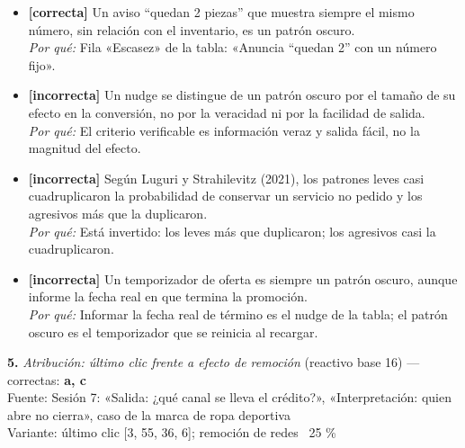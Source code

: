 \documentclass[10pt,letterpaper]{article}
\begin{document}
\begin{itemize}[leftmargin=1.2em,itemsep=0pt,topsep=1pt,parsep=0pt]
\item[\textbf{a)}] {\footnotesize \textbf{[correcta]} Un aviso \enquote{quedan 2 piezas} que muestra siempre el mismo número, sin relación con el inventario, es un patrón oscuro.\\ \textit{Por qué:} Fila «Escasez» de la tabla: «Anuncia \enquote{quedan 2} con un número fijo».}
\item[\textbf{b)}] {\footnotesize \textbf{[incorrecta]} Un nudge se distingue de un patrón oscuro por el tamaño de su efecto en la conversión, no por la veracidad ni por la facilidad de salida.\\ \textit{Por qué:} El criterio verificable es información veraz y salida fácil, no la magnitud del efecto.}
\item[\textbf{c)}] {\footnotesize \textbf{[incorrecta]} Según Luguri y Strahilevitz (2021), los patrones leves casi cuadruplicaron la probabilidad de conservar un servicio no pedido y los agresivos más que la duplicaron.\\ \textit{Por qué:} Está invertido: los leves más que duplicaron; los agresivos casi la cuadruplicaron.}
\item[\textbf{d)}] {\footnotesize \textbf{[incorrecta]} Un temporizador de oferta es siempre un patrón oscuro, aunque informe la fecha real en que termina la promoción.\\ \textit{Por qué:} Informar la fecha real de término es el nudge de la tabla; el patrón oscuro es el temporizador que se reinicia al recargar.}
\end{itemize}
\vspace{3pt}\noindent\textbf{5.} \textit{Atribución: último clic frente a efecto de remoción} (reactivo base 16) — correctas: \textbf{a, c}\\[-1pt]
{\scriptsize Fuente: Sesión 7: «Salida: ¿qué canal se lleva el crédito?», «Interpretación: quien abre no cierra», caso de la marca de ropa deportiva}
\\{\scriptsize Variante: último clic [3, 55, 36, 6]; remoción de redes ~25 \%}
\end{document}
